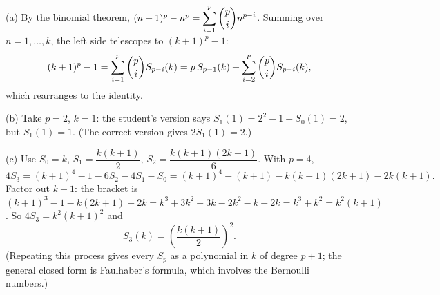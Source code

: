 (a) By the binomial theorem, $(n+1)^p-n^p=\displaystyle\sum_{i=1}^{p}\dbinom pi n^{p-i}$. Summing over $n=1,\dots,k$, the left side telescopes to $(k+1)^p-1$:
\[
(k+1)^p-1=\sum_{i=1}^{p}\dbinom pi S_{p-i}(k)=p\,S_{p-1}(k)+\sum_{i=2}^{p}\dbinom pi S_{p-i}(k),
\]
which rearranges to the identity.

(b) Take $p=2$, $k=1$: the student's version says $S_1(1)=2^2-1-S_0(1)=2$, but $S_1(1)=1$. (The correct version gives $2S_1(1)=2$.)

(c) Use $S_0=k$, $S_1=\dfrac{k(k+1)}{2}$, $S_2=\dfrac{k(k+1)(2k+1)}{6}$. With $p=4$,
\[
4S_3=(k+1)^4-1-6S_2-4S_1-S_0=(k+1)^4-(k+1)-k(k+1)(2k+1)-2k(k+1).
\]
Factor out $k+1$: the bracket is $(k+1)^3-1-k(2k+1)-2k=k^3+3k^2+3k-2k^2-k-2k=k^3+k^2=k^2(k+1)$. So $4S_3=k^2(k+1)^2$ and
\[
S_3(k)=\boxed{\left(\dfrac{k(k+1)}{2}\right)^2}.
\]
(Repeating this process gives every $S_p$ as a polynomial in $k$ of degree $p+1$; the general closed form is Faulhaber's formula, which involves the Bernoulli numbers.)
